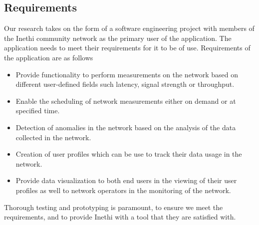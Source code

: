 \subsection{Requirements}
Our research takes on the form of a software engineering project with members of the Inethi community network as the primary user of the application. The application needs to meet their requirements for it to be of use.
Requirements of the application are as follows 
\begin{itemize}
	\item Provide functionality to perform measurements on the network based on different user-defined fields such latency, signal strength or throughput.
	
	\item Enable the scheduling of network measurements either on demand or at specified time.  
	
	\item Detection of anomalies in the network based on the analysis of the data collected in the network.
	
	\item Creation of user profiles which can be use to track their data usage in the network. 
	
	\item Provide data visualization to both end users in the viewing of their user profiles as well to network operators in the monitoring of the network.
\end{itemize}
Thorough testing and prototyping is paramount, to ensure we meet the requirements, and to provide Inethi with a tool that they are satisfied with.
